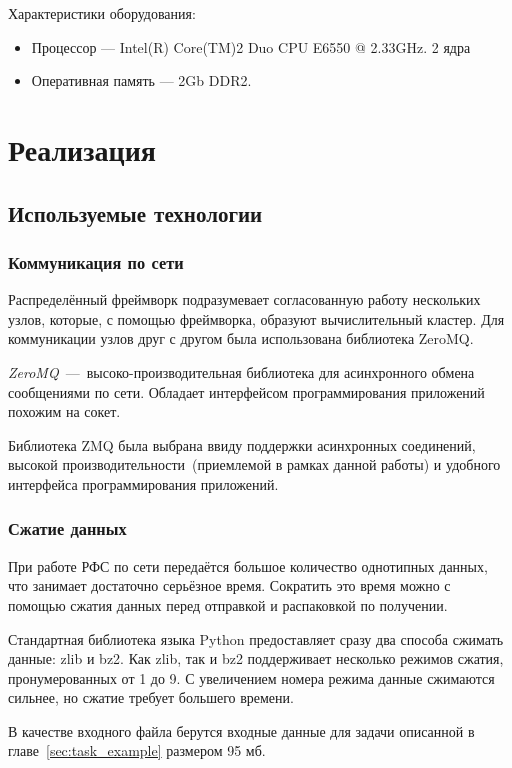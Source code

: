 \documentclass[12pt,a4paper,oneside]{extarticle}
\begin{document}
        \noindent Характеристики оборудования:
        \begin{itemize}
            \item Процессор --- Intel(R) Core(TM)2 Duo CPU E6550 @ 2.33GHz. 2 ядра
            \item Оперативная память --- 2Gb DDR2.
        \end{itemize}
\clearpage

\section{Реализация}
    \subsection{Используемые технологии}
        \subsubsection{Коммуникация по сети}
            Распределённый фреймворк подразумевает согласованную работу нескольких узлов, которые, с помощью фреймворка, образуют вычислительный кластер. Для коммуникации узлов друг с другом была использована библиотека ZeroMQ.

            {\it ZeroMQ}~---~высоко-производительная библиотека для асинхронного обмена сообщениями по сети. Обладает интерфейсом программирования приложений похожим на сокет. 

            Библиотека ZMQ была выбрана ввиду поддержки асинхронных соединений, высокой производительности~(приемлемой в рамках данной работы) и удобного интерфейса программирования приложений.

        \subsubsection{Сжатие данных}
            При работе РФС по сети передаётся большое количество однотипных данных, что занимает достаточно серьёзное время. Сократить это время можно с помощью сжатия данных перед отправкой и распаковкой по получении.

            Стандартная библиотека языка Python предоставляет сразу два способа сжимать данные: zlib и bz2. Как zlib, так и bz2 поддерживает несколько режимов сжатия, пронумерованных от 1 до 9. С увеличением номера режима данные сжимаются сильнее, но сжатие требует большего времени.

            В качестве входного файла берутся входные данные для задачи описанной в главе~\ref{sec:task_example} размером 95 мб.
\end{document}

